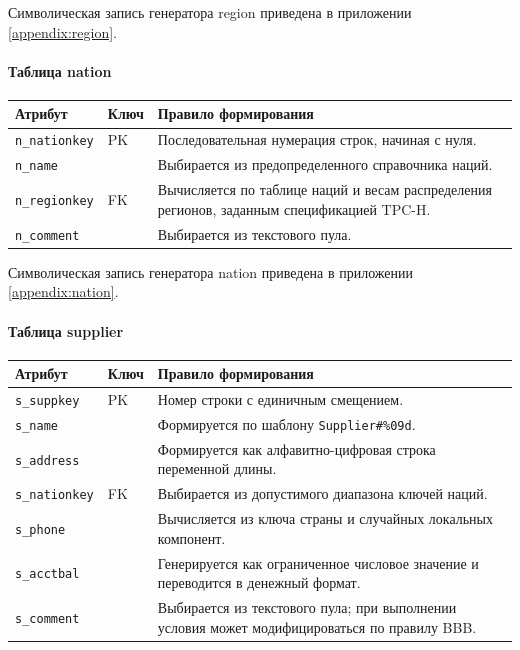\noindent Символическая запись генератора region приведена в
приложении \ref{appendix:region}.

\paragraph{Таблица nation}
\begin{center}
\small
\begin{tabular}{|p{}|p{}|p{}|}
\hline
\textbf{Атрибут} & \textbf{Ключ} & \textbf{Правило формирования} \\
\hline
\texttt{n\_nationkey} & PK & Последовательная нумерация строк, начиная с нуля. \\
\hline
\texttt{n\_name} &  & Выбирается из предопределенного справочника наций. \\
\hline
\texttt{n\_regionkey} & FK & Вычисляется по таблице наций и весам распределения регионов, заданным спецификацией TPC-H. \\
\hline
\texttt{n\_comment} &  & Выбирается из текстового пула. \\
\hline
\end{tabular}
\end{center}

\noindent Символическая запись генератора nation приведена в
приложении \ref{appendix:nation}.

\paragraph{Таблица supplier}
\begin{center}
\small
\begin{tabular}{|p{}|p{}|p{}|}
\hline
\textbf{Атрибут} & \textbf{Ключ} & \textbf{Правило формирования} \\
\hline
\texttt{s\_suppkey} & PK & Номер строки с единичным смещением. \\
\hline
\texttt{s\_name} &  & Формируется по шаблону \texttt{Supplier\#\%09d}. \\
\hline
\texttt{s\_address} &  & Формируется как алфавитно-цифровая строка переменной длины. \\
\hline
\texttt{s\_nationkey} & FK & Выбирается из допустимого диапазона ключей наций. \\
\hline
\texttt{s\_phone} &  & Вычисляется из ключа страны и случайных локальных компонент. \\
\hline
\texttt{s\_acctbal} &  & Генерируется как ограниченное числовое значение и переводится в денежный формат. \\
\hline
\texttt{s\_comment} &  & Выбирается из текстового пула; при выполнении условия может модифицироваться по правилу BBB. \\
\hline
\end{tabular}
\end{center}

